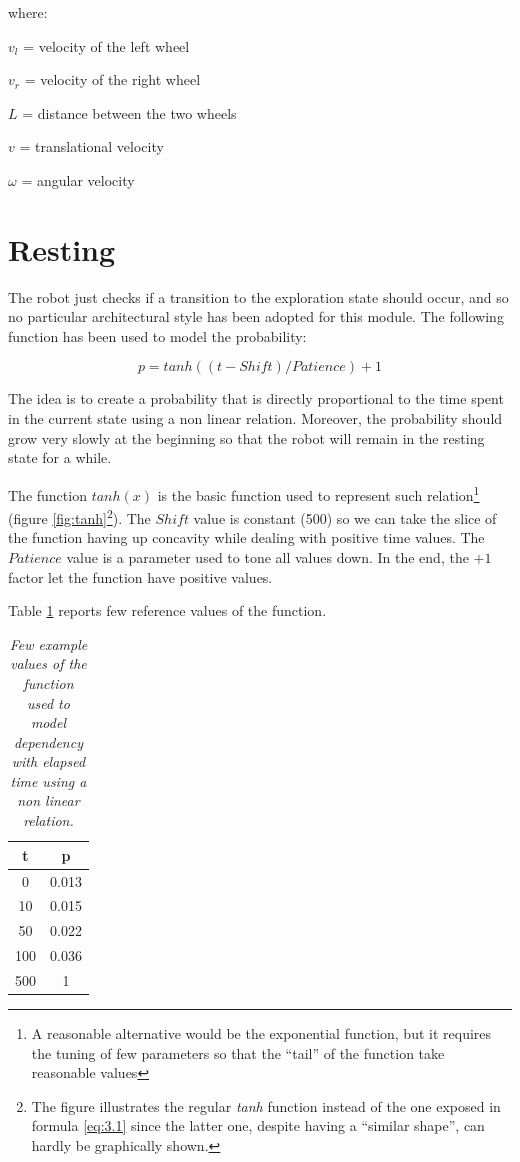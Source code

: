 \noindent
where:

\smallskip
\noindent
$v_l$ = velocity of the left wheel

\noindent
$v_r$ = velocity of the right wheel

\noindent
$L$ = distance between the two wheels

\noindent
$v$ = translational velocity

\noindent
$\omega$ = angular velocity

\section{Resting}

The robot just checks if a transition to the exploration state should occur, and so no particular architectural style has been adopted for this module. The following function has been used to model the probability:

\begin{equation}
    p = tanh((t - Shift) / Patience) + 1 \tag{3.1}\label{eq:3.1}
\end{equation}

\noindent
The idea is to create a probability that is directly proportional to the time spent in the current state using a non linear relation. Moreover, the probability should grow very slowly at the beginning so that the robot will remain in the resting state for a while. 

\noindent
The function $tanh(x)$ is the basic function used to represent such relation\footnote{A reasonable alternative would be the exponential function, but it requires the tuning of few parameters so that the ``tail'' of the function take reasonable values} (figure \ref{fig:tanh}\footnote{The figure illustrates the regular \textit{tanh} function instead of the one exposed in formula \ref{eq:3.1} since the latter one, despite having a ``similar shape'', can hardly be graphically shown.}). The $Shift$ value is constant (500) so we can take the slice of the function having up concavity while dealing with positive time values. The $Patience$ value is a parameter used to tone all values down. In the end, the $+1$ factor let the function have positive values.  

\noindent
Table \ref{tab:f-values} reports few reference values of the function.

\begin{table}[H]
\centering
\begin{tabular}{| c | c |}

\hline
t & p \\
\hline
 0  & 0.013 \\
 10 & 0.015 \\
 50 & 0.022 \\
100 & 0.036 \\
500 & 1 \\
\hline

\end{tabular}
\caption{\label{tab:f-values}\textit{Few example values of the function used to model dependency with elapsed time using a non linear relation.}}
\end{table}

